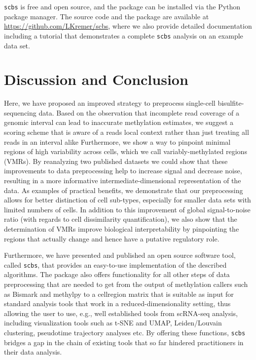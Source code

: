 \documentclass[twocolumn,10pt]{article}
\begin{document}
\texttt{scbs} is free and open source, and the package can be installed via the Python package manager. The source code and the package are available at \href{https://github.com/LKremer/scbs}{https://github.com/LKremer/scbs}, where we also provide detailed documentation including a tutorial that demonstrates a complete \texttt{scbs} analysis on an example data set.




\section{Discussion and Conclusion}

Here, we have proposed an improved strategy to preprocess single-cell bisulfite-sequencing data.
Based on the observation that incomplete read coverage of a genomic interval can lead to inaccurate methylation estimates, we suggest a scoring scheme that is aware of a reads local context rather than just treating all reads in an interval alike
Furthermore, we show a way to pinpoint minimal regions of high variability across cells, which we call variably-methylated regions (VMRs).
By reanalyzing two published datasets we could show that these improvements to data preprocessing help to increase signal and decrease noise, resulting in a more informative intermediate-dimensional representation of the data. As examples of practical benefits, we demonstrate that our preprocessing allows for better distinction of cell sub-types, especially for smaller data sets with limited numbers of cells. In addition to this improvement of global signal-to-noise ratio (with regards to cell dissimilarity quantification), we also show that the determination of VMRs improve biological interpretability by pinpointing the regions that actually change and hence have a putative regulatory role.

Furthermore, we have presented and published an open source software tool, called \texttt{scbs}, that provides an easy-to-use implementation of the described algorithms. The package also offers functionality for all other steps of data preprocessing that are needed to get from the output of methylation callers such as Bismark and methylpy to a cell\texttimes region matrix that is suitable as input for standard analysis tools that work in a reduced-dimensionality setting, thus allowing the user to use, e.g., well established tools from scRNA-seq analysis, including visualization tools such as t-SNE and UMAP, Leiden/Louvain clustering, pseudotime trajectory analyses etc. By offering these functions, \texttt{scbs} bridges a gap in the chain of existing tools that so far hindered practitioners in their data analysis.
\end{document}
